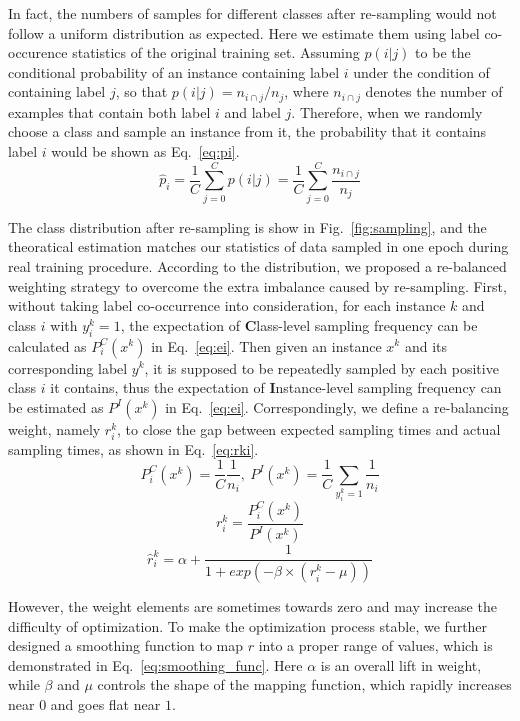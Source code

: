 \documentclass[runningheads]{llncs}
\begin{document}
In fact, the numbers of samples for different classes after re-sampling would not follow a uniform distribution as expected.
Here we estimate them using label co-occurence statistics of the original training set. 
Assuming $p(i|j)$ to be the conditional probability of an instance containing label $i$ under the condition of containing label $j$, so that $p(i|j) = n_{i\cap j} / n_j$, where $n_{i\cap j}$ denotes the number of examples that contain both label $i$ and label $j$. 
Therefore, when we randomly choose a class and sample an instance from it, the probability that it contains label $i$ would be shown as Eq.~\ref{eq:pi}.
\begin{equation}
\hat{p}_i = \frac{1}{C}\sum_{j=0}^Cp(i|j) =\frac{1}{C}\sum_{j=0}^C{\frac{n_{i\cap j}}{n_j}}
\label{eq:pi}
\end{equation}

The class distribution after re-sampling is show in Fig.~\ref{fig:sampling}, and the theoratical estimation matches our statistics of data sampled in one epoch during real training procedure. 
According to the distribution, we proposed a re-balanced weighting strategy to overcome the extra imbalance caused by re-sampling.
First, without taking label co-occurrence into consideration, for each instance $k$ and class $i$ with $y^k_i=1$, the expectation of \textbf{C}lass-level sampling frequency can be calculated as $P^C_i(x^k)$ in Eq.~\ref{eq:ei}.
Then given an instance $x^k$ and its corresponding label $y^k$, it is supposed to be repeatedly sampled by each positive class $i$ it contains, thus the expectation of \textbf{I}nstance-level sampling frequency can be estimated as $P^I(x^k)$ in Eq.~\ref{eq:ei}. Correspondingly, we define a re-balancing weight, namely $r^k_i$, to close the gap between expected sampling times and actual sampling times, as shown in Eq.~\ref{eq:rki}.
\begin{equation}
    P^C_i(x^k)=\frac{1}{C}\frac{1}{n_i}, \ P^I(x^k) = \frac{1}{C}\sum_{y^k_i = 1}\frac{1}{n_i}
\label{eq:ei}
\end{equation}
\begin{equation}
    r^k_i = \frac{P^C_i(x^k)}{P^I(x^k)} \label{eq:rki}
\end{equation}
\begin{equation}
    \hat{r}^k_i = \alpha + \frac{1}{1 + exp(-\beta \times (r^k_i - \mu))}
    \label{eq:smoothing_func}
\end{equation}

However, the weight elements are sometimes towards zero and may increase the difficulty of optimization.
To make the optimization process stable, we further designed a smoothing function to map $r$ into a proper range of values, which is demonstrated in Eq.~\ref{eq:smoothing_func}.
Here $\alpha$ is an overall lift in weight, while $\beta$ and $\mu$ controls the shape of the mapping function, which rapidly increases near $0$ and goes flat near $1$.
\end{document}
